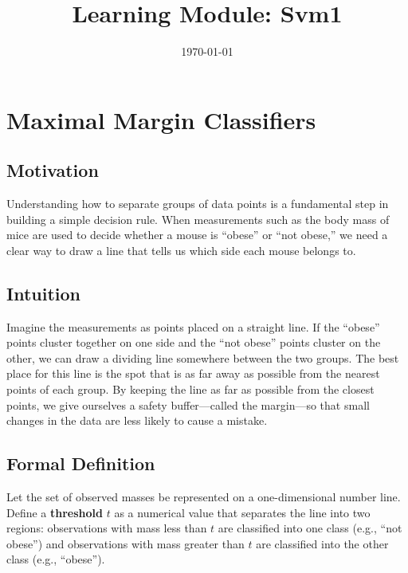 \documentclass[12pt, a4paper]{article}
\title{Learning Module: Svm1}
\author{}
\date{\today}
\begin{document}
\maketitle
\thispagestyle{empty}
\newpage

\tableofcontents
\newpage


\section{Maximal Margin Classifiers}

\subsection{Motivation}
Understanding how to separate groups of data points is a fundamental step in building a simple decision rule.  When measurements such as the body mass of mice are used to decide whether a mouse is ``obese'' or ``not obese,'' we need a clear way to draw a line that tells us which side each mouse belongs to.

\subsection{Intuition}
Imagine the measurements as points placed on a straight line.  If the ``obese'' points cluster together on one side and the ``not obese'' points cluster on the other, we can draw a dividing line somewhere between the two groups.  The best place for this line is the spot that is as far away as possible from the nearest points of each group.  By keeping the line as far as possible from the closest points, we give ourselves a safety buffer---called the margin---so that small changes in the data are less likely to cause a mistake.

\subsection{Formal Definition}
Let the set of observed masses be represented on a one-dimensional number line.  Define a \textbf{threshold} \(t\) as a numerical value that separates the line into two regions: observations with mass less than \(t\) are classified into one class (e.g., ``not obese'') and observations with mass greater than \(t\) are classified into the other class (e.g., ``obese'').  
\end{document}
